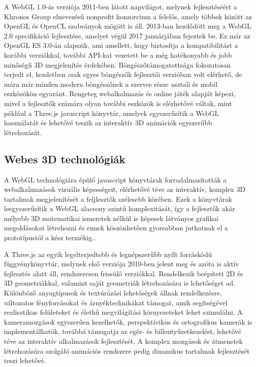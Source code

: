 \documentclass[12pt]{report}
\begin{document}
        A WebGL 1.0-ás verziója 2011-ben látott napvilágot, melynek fejlesztéséért a Khronos Group elnevezésű nonprofit konzorcium a felelős, amely többek között az OpenGL és OpenCL szabványok mögött is áll. 2013-ban kezdődött meg a WebGL 2.0 specifikáció fejlesztése, amelyet végül 2017 januárjában fejeztek be. Ez már az OpenGL ES 3.0-án alapszik, ami amellett, hogy biztosítja a kompatibilitást a korábbi verziókkal, további API-kat vezetett be a még hatékonyabb és jobb minőségű 3D megjelenítés érdekében.
        Böngészőtámogatottsága fokozatosan terjedt el, kezdetben csak egyes böngészők fejlesztői verzióban volt elérhető, de mára már minden modern böngészőnek a szerves része asztali és mobil eszközökön egyaránt. Rengeteg webalkalmazás és online játék alapját képezi, mivel a fejlesztők számára olyan további eszközök is elérhetővé váltak, mint például a Three.js javascript könyvtár, amelyek egyszerűsítik a WebGL használatát és lehetővé teszik az interaktív 3D animációk egyszerűbb létrehozását.
        
        \subsection{Webes 3D technológiák}

        A WebGL technológiára épülő javascript könyvtárak forradalmasították a webalkalmazások vizuális képességeit, elérhetővé téve az interaktív, komplex 3D tartalmak megjelenítését a feljlesztők szélesebb körében. Ezek a könyvtárak leegyszerűsítik a WebGL alacsony szintű komplexitását, így a fejlesztők akár mélyebb 3D matematikai ismeretek nélkül is képesek látványos grafikai megoldásokat létrehozni és ennek köszönhetően gyorsabban juthatnak el a prototípustól a kész termékig..
        
        A Three.js az egyik legelterjedtebb és legnépszerűbb nyílt forráskódú függvénykönyvtár, melynek első verziója 2010-ben jelent meg és azóta is aktív fejlesztés alatt áll, rendszeresen frissülő verziókkal. Rendelkezik beépített 2D és 3D geometriákkal, valamint saját geometriák létrehozására is lehetőséget ad. Különböző anyagtípusok és textúrázási lehetőségek állnak rendelkezésre, változatos fényforrásokat és árnyéktechnikákat támogat, amik segítségével realisztikus felületeket és élethű megvilágítási környezeteket lehet szimulálni. A kameramozgások egyszerűen kezelhetők, perspektívikus és ortografikus kamerák is implementálhatók, továbbá támogatja az egér- és billentyűzetkezelést, lehetővé téve az interaktív alkalmazások fejlesztését. A komplex mozgások és átmenetek létrehozására szolgáló animációs rendszere pedig dinamikus tartalmak fejlesztését teszi lehetővé. 
        
\end{document}
